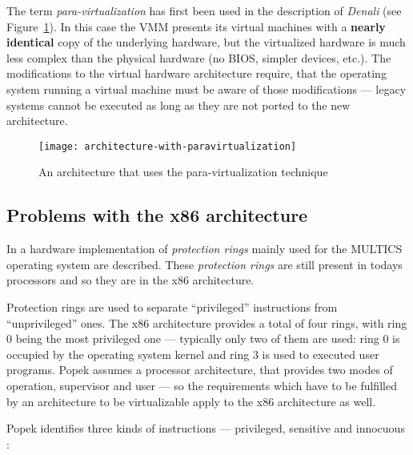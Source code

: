 The term \emph{para-virtualization} has first been used in the description
of  \emph{Denali}  \cite{denali}  (see Figure~\ref{fig:arch-para-virt}).  In
this  case the  VMM presents  its virtual  machines with  a \textbf{nearly
  identical} copy of the underlying hardware, but the virtualized hardware
is much less complex than the physical hardware (no BIOS, simpler devices,
etc.).  The  modifications to  the virtual hardware  architecture require,
that the operating system running a virtual machine must be aware of those
modifications --- legacy  systems cannot be executed as  long as they are
not ported to the new architecture.

\begin{figure}[htbp]
  \centering
  \texttt{[image: architecture-with-paravirtualization]}
  \caption[Para-virtualization architecture]{An architecture that uses the
    para-virtualization technique}
  \label{fig:arch-para-virt}
\end{figure}

\subsection{Problems with the x86 architecture}
\label{sec:x86-problems}

In \cite{schroeder72} a hardware implementation of \emph{protection rings}
mainly  used  for  the  MULTICS  operating system  are  described.   These
\emph{protection rings} are still present in todays processors and so they
are in the x86 architecture.

Protection  rings are  used to  separate ``privileged''  instructions from
``unprivileged''  ones. The  x86  architecture provides  a  total of  four
rings, with ring 0 being the most privileged one --- typically only two of
them are used: ring 0 is  occupied by the operating system kernel and ring
3  is used  to executed  user  programs.  Popek  \cite{popek74} assumes  a
processor architecture,  that provides two modes  of operation, supervisor
and  user  --- so  the  requirements  which have  to  be  fulfilled by  an
architecture to be virtualizable apply to the x86 architecture as well.

Popek identifies three kinds of instructions --- privileged, sensitive and
innocuous \cite{popek74}:

